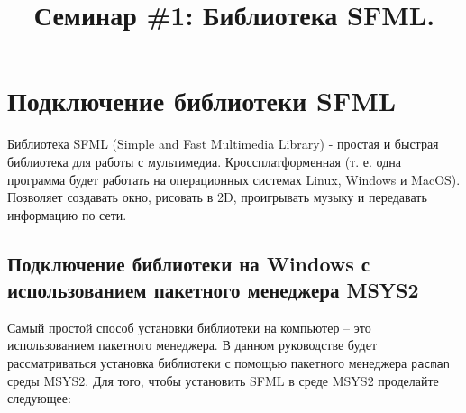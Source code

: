 \documentclass{article}
\begin{document}
\title{Семинар \#1: Библиотека SFML.\vspace{-5ex}}\date{}\maketitle


\section{Подключение библиотеки SFML}
Библиотека SFML (Simple and Fast Multimedia Library) - простая и быстрая библиотека для работы с мультимедиа. Кроссплатформенная (т. е. одна программа будет работать на операционных системах Linux, Windows и MacOS). Позволяет создавать окно, рисовать в 2D, проигрывать музыку и передавать информацию по сети. 

\subsection*{Подключение библиотеки на Windows с использованием пакетного менеджера MSYS2}
Самый простой способ установки библиотеки на компьютер -- это использованием пакетного менеджера. В данном руководстве будет рассматриваться установка библиотеки с помощью пакетного менеджера \texttt{pacman} среды MSYS2. Для того, чтобы установить SFML в среде MSYS2 проделайте следующее:
\end{document}
